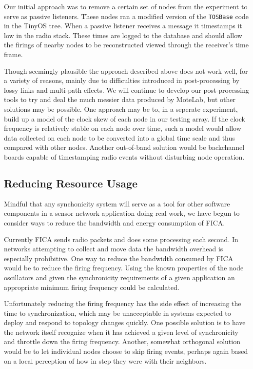 Our initial approach was to remove a certain set of nodes from the experiment
to serve as passive listeners.  These nodes ran a modified version of the
{\tt TOSBase} code in the TinyOS tree.  When a passive listener
receives a message it timestamps it low in the radio stack.  These times are
logged to the database and should allow the firings of nearby nodes to be
reconstructed viewed through the receiver's time frame.

Though seemingly plausible the approach described above does not work well,
for a variety of reasons, mainly due to difficulties introduced
in post-processing by lossy links and multi-path effects.  We will continue
to develop our post-processing tools to try and deal the much messier data
produced by MoteLab, but other solutions may be possible.  One approach may
be to, in a seperate experiment, build up a model of the clock skew of each
node in our testing array.  If the clock frequency is relatively stable on
each node over time, such a model would allow data collected on each node to
be converted into a global time scale and thus compared with other nodes.
Another out-of-band solution would be backchannel boards capable of
timestamping radio events without disturbing node operation.

\subsection{Reducing Resource Usage}

Mindful that any synchonicity system will serve as a tool for other software
components in a sensor network application doing real work, we have begun to
consider ways to reduce the bandwidth and energy consumption of FICA.

Currently FICA sends radio packets and does some processing each second.  In
networks attempting to collect and move data the bandwidth overhead is
especially prohibitive.  One way to reduce the bandwidth consumed by FICA
would be to reduce the firing frequency.  Using the known properties of the
node oscillators and given the synchronicity requirements of a given
application an appropriate minimum firing frequency could be calculated.

Unfortunately reducing the firing frequency has the side effect of increasing
the time to synchronization, which may be unacceptable in systems expected to
deploy and respond to topology changes quickly.  One possible solution is to
have the network itself recognize when it has achieved a given level of
synchronicity and throttle down the firing frequency.  Another, somewhat
orthogonal solution would be to let individual nodes choose to skip firing
events, perhaps again based on a local perception of how in step they were
with their neighbors.
